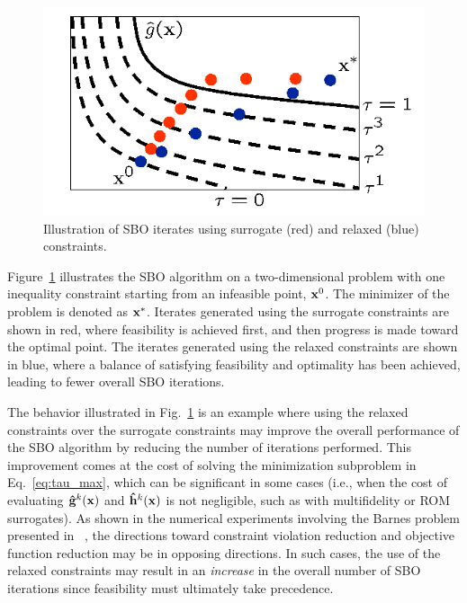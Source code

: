 \begin{figure}
  \centering
  \includegraphics[width=.35\textwidth]{images/tau_updates}
  \caption{Illustration of SBO iterates using surrogate (red) and
  relaxed (blue) constraints.}
  \label{fig:constr_relax}
\end{figure}
Figure~\ref{fig:constr_relax} illustrates the SBO algorithm on a
two-dimensional problem with one inequality constraint starting from
an infeasible point, ${\bf x}^0$.  The minimizer of the problem is
denoted as ${\bf x}^*$.  Iterates generated using the surrogate
constraints are shown in red, where feasibility is achieved first, and
then progress is made toward the optimal point.  The iterates
generated using the relaxed constraints are shown in blue, where a
balance of satisfying feasibility and optimality has been achieved,
leading to fewer overall SBO iterations.

The behavior illustrated in Fig.~\ref{fig:constr_relax} is an example
where using the relaxed constraints over the surrogate constraints may
improve the overall performance of the SBO algorithm by reducing the
number of iterations performed.  This improvement comes at the cost of
solving the minimization subproblem in Eq.~\ref{eq:tau_max}, which can
be significant in some cases (i.e., when the cost of evaluating 
${\bf {\hat g}}^k({\bf x})$ and ${\bf {\hat h}}^k({\bf x})$ is not
negligible, such as with multifidelity or ROM surrogates).  As shown
in the numerical experiments involving the Barnes problem presented 
in ~\cite{Per04a}, 
the directions toward constraint violation
reduction and objective function reduction may be in opposing
directions.  In such cases, the use of the relaxed constraints may
result in an {\em increase} in the overall number of SBO iterations
since feasibility must ultimately take precedence.
